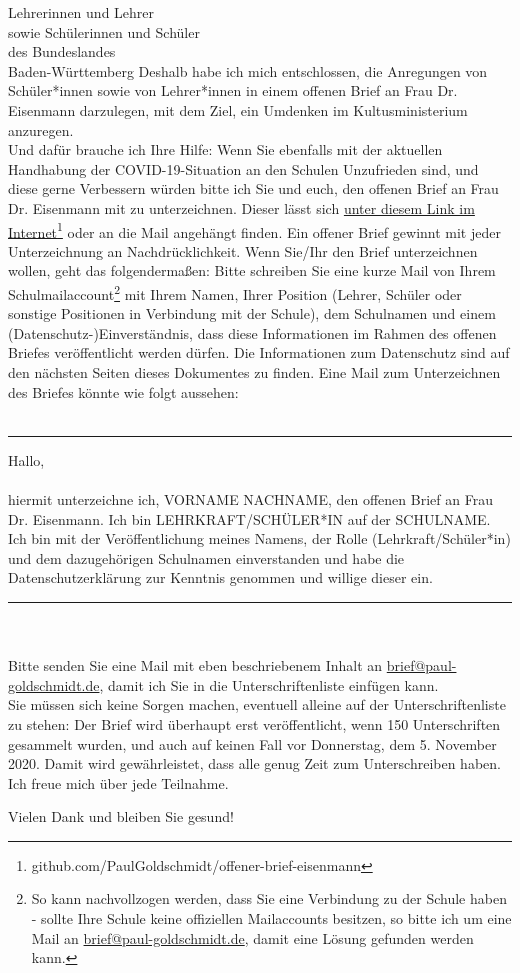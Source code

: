 \documentclass[
	fontsize=12pt,
	parskip=full,
	paper=A4,	
	fromalign=right,
	fromemail=true,
	version=last,
]{scrlttr2}
\begin{document}
\begin{letter}{
	Lehrerinnen und Lehrer\\
	sowie Schülerinnen und Schüler\\
	des Bundeslandes\\
	Baden-Württemberg
}
Deshalb habe ich mich entschlossen, die Anregungen von Schü\-ler*innen sowie von Lehrer*innen in einem offenen Brief an Frau Dr. Eisenmann darzulegen, mit dem Ziel, ein Umdenken im Kultusministerium anzuregen.\\Und dafür brauche ich Ihre Hilfe: Wenn Sie ebenfalls mit der aktuellen Handhabung der COVID-19-Situation an den Schulen Unzufrieden sind, und diese gerne Verbessern würden bitte ich Sie und euch, den offenen Brief an Frau Dr. Eisenmann mit zu unterzeichnen. Dieser lässt sich \href{https://raw.githubusercontent.com/PaulGoldschmidt/offener-brief-eisenmann/main/Brief_Eisenmann/brief.pdf}{\color{blue}unter diesem Link im Internet\footnote{\href{https://github.com/PaulGoldschmidt/offener-brief-eisenmann}{github.com/PaulGoldschmidt/offener-brief-eisenmann}}} oder an die Mail angehängt finden. Ein offener Brief gewinnt mit jeder Unterzeichnung an Nachdrücklichkeit. 
Wenn Sie/Ihr den Brief unterzeichnen wollen, geht das folgendermaßen: Bitte schreiben Sie eine kurze Mail von Ihrem Schulmailaccount\footnote{So kann nachvollzogen werden, dass Sie eine Verbindung zu der Schule haben - sollte Ihre Schule keine offiziellen Mailaccounts besitzen, so bitte ich um eine Mail an {\href{mailto:brief@paul-goldschmidt.de}{brief@paul-goldschmidt.de}, damit eine Lösung gefunden werden kann.}} mit Ihrem Namen, Ihrer Position (Lehrer, Schüler oder sonstige Positionen in Verbindung mit der Schule), dem Schulnamen und einem (Datenschutz-)Einverständnis, dass diese Informationen im Rahmen des offenen Briefes veröffentlicht werden dürfen. Die Informationen zum Datenschutz sind auf den nächsten Seiten dieses Dokumentes zu finden. 
Eine Mail zum Unterzeichnen des Briefes könnte wie folgt aussehen: \\\\
\noindent\rule{\textwidth}{0.5pt}
\textsf{Hallo,\\\\hiermit unterzeichne ich, VORNAME NACHNAME, den offenen Brief an Frau Dr. Eisenmann. Ich bin LEHRKRAFT/SCHÜLER*IN auf der SCHULNAME. Ich bin mit der Veröffentlichung meines Namens, der Rolle (Lehrkraft/Schüler*in) und dem dazugehörigen Schulnamen einverstanden und habe die Datenschutzerklärung zur Kenntnis genommen und willige dieser ein.\\}
\noindent\rule{\textwidth}{0.5pt}
\\\\Bitte senden Sie eine Mail mit eben beschriebenem Inhalt an \href{mailto:brief@paul-goldschmidt.de}{\color{blue}brief@paul-goldschmidt.de}, damit ich Sie in die Unterschriftenliste einfügen kann. \\
Sie müssen sich keine Sorgen machen, eventuell alleine auf der Unterschriftenliste zu stehen: Der Brief wird überhaupt erst veröffentlicht, wenn 150 Unterschriften gesammelt wurden, und auch auf keinen Fall vor Donnerstag, dem 5. November 2020. Damit wird gewährleistet, dass alle genug Zeit zum Unterschreiben haben. \\
Ich freue mich über jede Teilnahme.
\closing{Vielen Dank und bleiben Sie gesund!}


\end{letter}
\end{document}
